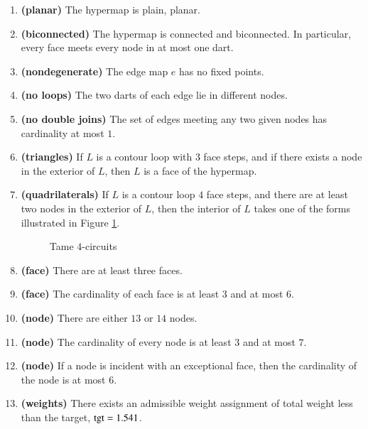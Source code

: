 \begin{enumerate}
    \label{definition:tame}
    \item {\bf (planar)} The hypermap is plain, planar.
    \item {\bf (biconnected)} The hypermap is connected and biconnected.  In particular, every face meets every node in at most one dart.
    \item {\bf (nondegenerate)} The edge map $e$ has no fixed points.
    \item {\bf (no loops)} The two darts of each edge lie in different nodes.
    \item {\bf (no double joins)} The set of edges meeting any two given nodes has cardinality at most $1$.
    \label{definition:tame:40}

    \item {\bf (triangles)} If $L$ is a contour loop with $3$ face steps, and if there exists a node in
    the exterior of $L$, then $L$ is a face of the hypermap.
    \label{definition:tame:3-circuit}

    \item {\bf (quadrilaterals)} If $L$ is a contour loop  $4$ face steps, and there are at least two nodes
    in the exterior of $L$, then the interior of $L$ takes one of the forms
    illustrated in Figure
    \ref{fig:fourcircuit}.
    \label{definition:tame:4-circuit}
    \begin{figure}[htb]
        \centering
        \caption{Tame $4$-circuits}
        \label{fig:fourcircuit}
    \end{figure}
  \item {\bf (face)} There are at least three faces.
    \item {\bf (face)} The cardinality of each face is at least $3$ and at most $6$.
    \label{definition:tame:length}
    \item {\bf (node)} There are either $13$ or $14$ nodes.
    \item {\bf (node)} The cardinality of every node is at least $3$ and at most
    $7$.
    \label{definition:tame:degree}
    \item {\bf (node)} If a node is incident with an exceptional face,
        then the cardinality of the node is at most $6$.
    \label{definition:tame:degreeE}
    \item {\bf (weights)} There exists an admissible weight assignment
        of total weight less than the target, ${\operatorname{tgt}}=1.541$.
    \label{definition:tame:squander}
\end{enumerate}
%

